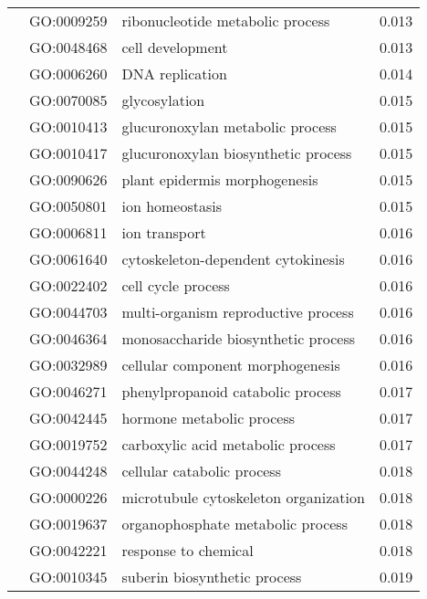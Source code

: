 \begin{longtable}{lllr}
   & GO:0009259 &             ribonucleotide metabolic process &         0.013 \\
   & GO:0048468 &                             cell development &         0.013 \\
   & GO:0006260 &                              DNA replication &         0.014 \\
   & GO:0070085 &                                glycosylation &         0.015 \\
   & GO:0010413 &             glucuronoxylan metabolic process &         0.015 \\
   & GO:0010417 &          glucuronoxylan biosynthetic process &         0.015 \\
   & GO:0090626 &                plant epidermis morphogenesis &         0.015 \\
   & GO:0050801 &                              ion homeostasis &         0.015 \\
   & GO:0006811 &                                ion transport &         0.016 \\
   & GO:0061640 &           cytoskeleton-dependent cytokinesis &         0.016 \\
   & GO:0022402 &                           cell cycle process &         0.016 \\
   & GO:0044703 &          multi-organism reproductive process &         0.016 \\
   & GO:0046364 &          monosaccharide biosynthetic process &         0.016 \\
   & GO:0032989 &             cellular component morphogenesis &         0.016 \\
   & GO:0046271 &            phenylpropanoid catabolic process &         0.017 \\
   & GO:0042445 &                    hormone metabolic process &         0.017 \\
   & GO:0019752 &            carboxylic acid metabolic process &         0.017 \\
   & GO:0044248 &                   cellular catabolic process &         0.018 \\
   & GO:0000226 &        microtubule cytoskeleton organization &         0.018 \\
   & GO:0019637 &            organophosphate metabolic process &         0.018 \\
   & GO:0042221 &                         response to chemical &         0.018 \\
   & GO:0010345 &                 suberin biosynthetic process &         0.019 \\

\end{longtable}
